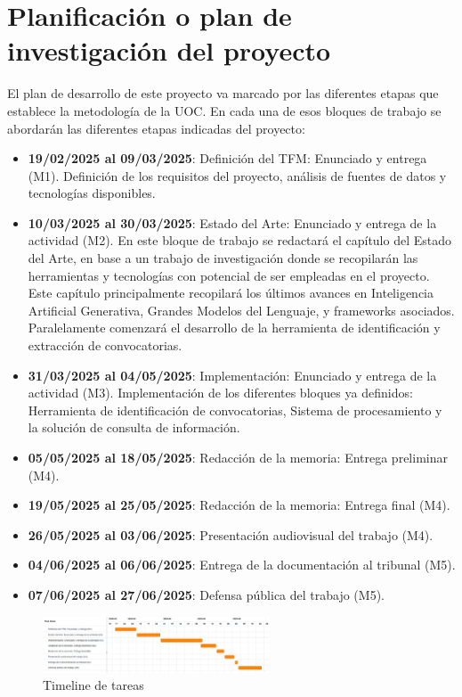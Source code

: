 \begin{itemize}
\begin{itemize}
\end{itemize}


\end{itemize}

\newpage

\section{Planificación o plan de investigación del proyecto}

El plan de desarrollo de este proyecto va marcado por las diferentes etapas que establece la metodología de la UOC.
En cada una de esos bloques de trabajo se abordarán las diferentes etapas indicadas del proyecto:

\begin{itemize}
    \item \textbf{19/02/2025 al 09/03/2025}:
    Definición del TFM: Enunciado y entrega (M1).
    Definición de los requisitos del proyecto, análisis de fuentes de datos y tecnologías disponibles.
    \item \textbf{10/03/2025 al 30/03/2025}:
    Estado del Arte: Enunciado y entrega de la actividad (M2). 
    En este bloque de trabajo se redactará el capítulo del Estado del Arte, en base a un trabajo de investigación donde se recopilarán las herramientas y tecnologías con potencial de ser empleadas en el proyecto.
    Este capítulo principalmente recopilará los últimos avances en Inteligencia Artificial Generativa, Grandes Modelos del Lenguaje, y frameworks asociados.
    Paralelamente comenzará el desarrollo de la herramienta de identificación y extracción de convocatorias.
    \item \textbf{31/03/2025 al 04/05/2025}:
    Implementación: Enunciado y entrega de la actividad (M3).
    Implementación de los diferentes bloques ya definidos: Herramienta de identificación de convocatorias, Sistema de procesamiento y la solución de consulta de información.
    \item \textbf{05/05/2025 al 18/05/2025}:
    Redacción de la memoria: Entrega preliminar (M4).
    \item \textbf{19/05/2025 al 25/05/2025}:
    Redacción de la memoria: Entrega final (M4).
    \item \textbf{26/05/2025 al 03/06/2025}:
    Presentación audiovisual del trabajo (M4).
    \item \textbf{04/06/2025 al 06/06/2025}:
    Entrega de la documentación al tribunal (M5).
    \item \textbf{07/06/2025 al 27/06/2025}:
    Defensa pública del trabajo (M5).
\end{itemize}

\begin{figure}[h]
	\centering
	\includegraphics[width=0.6\textwidth]{figs/gantt.png}
	\caption{Timeline de tareas}
	\label{fig:context-anoni1}
\end{figure}

